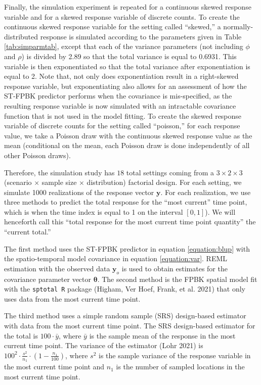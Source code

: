 \documentclass[smallextended]{svjour3}       %
\begin{document}
Finally, the simulation experiment is repeated for a continuous skewed
response variable and for a skewed response variable of discrete counts.
To create the continuous skewed response variable for the setting called
``skewed,'' a normally-distributed response is simulated according to
the parameters given in Table \ref{tab:simparmtab}, except that each of
the variance parameters (not including \(\phi\) and \(\rho\)) is divided
by 2.89 so that the total variance is equal to 0.6931. This variable is
then exponentiated so that the total variance after exponentiation is
equal to 2. Note that, not only does exponentiation result in a
right-skewed response variable, but exponentiating also allows for an
assessment of how the ST-FPBK predictor performs when the covariance is
mis-specified, as the resulting response variable is now simulated with
an intractable covariance function that is not used in the model
fitting. To create the skewed response variable of discrete counts for
the setting called ``poisson,'' for each response value, we take a
Poisson draw with the continuous skewed response value as the mean
(conditional on the mean, each Poisson draw is done independently of all
other Poisson draws).

Therefore, the simulation study has \(18\) total settings coming from a
\(3 \times 2 \times 3\) (scenario \(\times\) sample size \(\times\)
distribution) factorial design. For each setting, we simulate 1000
realizations of the response vector \(\mathbf{y}\). For each
realization, we use three methods to predict the total response for the
``most current'' time point, which is when the time index is equal to 1
on the interval \([0, 1]\)). We will henceforth call this ``total
response for the most current time point quantity'' the ``current
total.''

The first method uses the ST-FPBK predictor in equation
\ref{equation:blup} with the spatio-temporal model covariance in
equation \ref{equation:var}. REML estimation with the observed data
\(\mathbf{y}_o\) is used to obtain estimates for the covariance
parameter vector \(\bm{\theta}\). The second method is the FPBK spatial
model fit with the \texttt{sptotal R} package (Higham, Ver Hoef, Frank,
et al. 2021) that only uses data from the most current time point.

The third method uses a simple random sample (SRS) design-based
estimator with data from the most current time point. The SRS
design-based estimator for the total is \(100 \cdot \bar{y}\), where
\(\bar{y}\) is the sample mean of the response in the most current time
point. The variance of the estimator (Lohr 2021) is
\(100^2 \cdot \frac{s^2}{n_1} \cdot (1 - \frac{n_1}{100})\), where
\(s^2\) is the sample variance of the response variable in the most
current time point and \(n_1\) is the number of sampled locations in the
most current time point.
\end{document}
